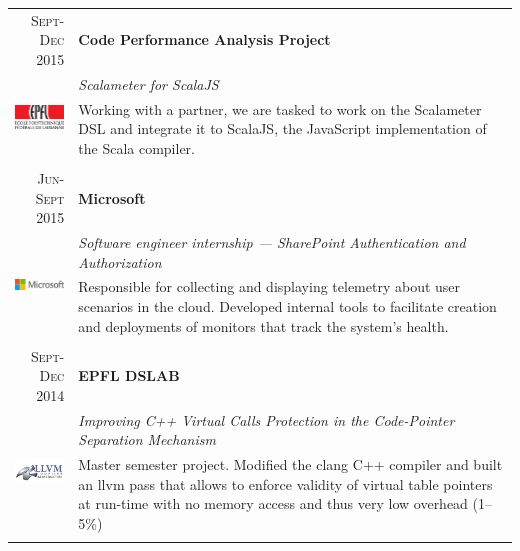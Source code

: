 \documentclass[a4paper,11pt]{article} %
\begin{document}
\begin{tabularx}{\textwidth}{r|X}

\textsc{Sept-Dec 2015} & \textbf{Code Performance Analysis Project} \\
\multirow{3}{*}{ \includegraphics[width=60pt]{img/epfl.eps}}
& \emph{Scalameter for ScalaJS}\\ 
& \footnotesize{Working with a partner, we are tasked to work on the Scalameter
DSL and integrate it to ScalaJS,
the JavaScript implementation of the Scala compiler.}\\
\multicolumn{2}{c}{} \\


\textsc{Jun-Sept 2015} & \textbf{Microsoft} \\
\multirow{2}{*}{ \includegraphics[width=60pt]{img/microsoft.eps}}
& \emph{Software engineer internship --- SharePoint Authentication and Authorization}\\ 
& \footnotesize{Responsible for collecting and displaying telemetry about user
scenarios in the cloud. Developed internal tools to facilitate creation and deployments
of monitors that track the system's health.}\\
\multicolumn{2}{c}{} \\


\textsc{Sept-Dec 2014} & \textbf{EPFL DSLAB} \\
\multirow{2}{*}{ \includegraphics[width=60pt]{img/llvm.eps}}
& \emph{Improving C++ Virtual Calls Protection in the Code-Pointer Separation Mechanism}\\ 
& \footnotesize{Master semester project. Modified the clang C++ compiler and
built an llvm pass that allows to enforce validity of virtual table pointers at
run-time with no memory access and thus very low overhead (1--5\%)}\\
\multicolumn{2}{c}{} \\



\end{tabularx}
\end{document}
